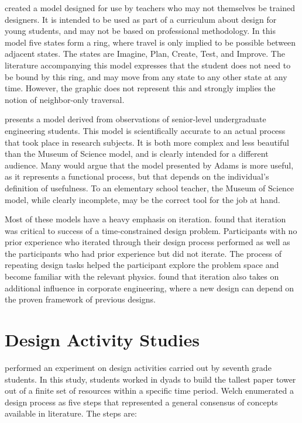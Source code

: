 \citet{mos-design} created a model designed for use by teachers who may not themselves be trained designers. It is intended to be used as part of a curriculum about design for young students, and may not be based on professional methodology. In this model five states form a ring, where travel is only implied to be possible between adjacent states. The states are Imagine, Plan, Create, Test, and Improve. The literature accompanying this model expresses that the student does not need to be bound by this ring, and may move from any state to any other state at any time. However, the graphic does not represent this and strongly implies the notion of neighbor-only traversal.

\citet{atman-2003} presents a model derived from observations of senior-level undergraduate engineering students. This model %
is scientifically accurate to an actual process that took place in research subjects. It is both more complex and less beautiful than the Museum of Science model, and is clearly intended for a different audience. Many would argue that the model presented by Adams is more useful, as it represents a functional process, but that depends on the individual's definition of usefulness. To an elementary school teacher, the Museum of Science model, while clearly incomplete, may be the correct tool for the job at hand. 

Most of these models have a heavy emphasis on iteration. \citet{dow09} found that iteration was critical to success of a time-constrained design problem. Participants with no prior experience who iterated through their design process performed as well as the participants who had prior experience but did not iterate. The process of repeating design tasks helped the participant explore the problem space and become familiar with the relevant physics. \citet{eckert09} found that iteration also takes on additional influence in corporate engineering, where a new design can depend on the proven framework of previous designs. 


\section{Design Activity Studies}
	\label{sec:activity-design-studies}
\citet{welch} performed an experiment on design activities
carried out by seventh grade students. In this study, students worked
in dyads to build the tallest paper tower out of a finite set of resources
within a specific time period. Welch enumerated a design process as
five steps that represented a general consensus of concepts available
in literature. The steps are:

